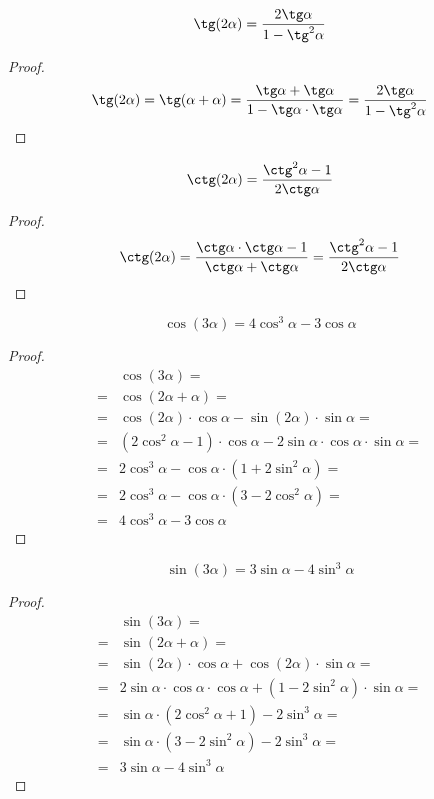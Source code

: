 \documentclass[12pt]{article}
\begin{document}
    \begin{statement}
        $$\tg(2\alpha)=\dfrac{2\tg\alpha}{1-\tg^2\alpha}$$
    \end{statement}
    \begin{proof}
        $$\tg(2\alpha)=\tg(\alpha+\alpha)=\dfrac{\tg\alpha+\tg\alpha}{1-\tg\alpha\cdot\tg\alpha}=\dfrac{2\tg\alpha}{1-\tg^2\alpha}$$
    \end{proof}
    \begin{statement}
        $$\ctg(2\alpha)=\dfrac{\ctg^2\alpha-1}{2\ctg\alpha}$$
    \end{statement}
    \begin{proof}
        $$\ctg(2\alpha)=\dfrac{\ctg\alpha\cdot\ctg\alpha-1}{\ctg\alpha+\ctg\alpha}=\dfrac{\ctg^2\alpha-1}{2\ctg\alpha}$$
    \end{proof}
    \begin{statement}
        $$\cos(3\alpha)=4\cos^3\alpha-3\cos\alpha$$
    \end{statement}
    \begin{proof}
        \begin{align*}
            &\cos(3\alpha)=\\
            =&\cos(2\alpha+\alpha)=\\
            =&\cos(2\alpha)\cdot\cos\alpha-\sin(2\alpha)\cdot\sin\alpha=\\
            =&(2\cos^2\alpha-1)\cdot\cos\alpha-2\sin\alpha\cdot\cos\alpha\cdot\sin\alpha=\\
            =&2\cos^3\alpha-\cos\alpha\cdot(1+2\sin^2\alpha)=\\
            =&2\cos^3\alpha-\cos\alpha\cdot(3-2\cos^2\alpha)=\\
            =&4\cos^3\alpha-3\cos\alpha
        \end{align*}
    \end{proof}
    \begin{statement}
        $$\sin(3\alpha)=3\sin\alpha-4\sin^3\alpha$$
    \end{statement}
    \begin{proof}
        \begin{align*}
            &\sin(3\alpha)=\\
            =&\sin(2\alpha+\alpha)=\\
            =&\sin(2\alpha)\cdot\cos\alpha+\cos(2\alpha)\cdot\sin\alpha=\\
            =&2\sin\alpha\cdot\cos\alpha\cdot\cos\alpha+(1-2\sin^2\alpha)\cdot\sin\alpha=\\
            =&\sin\alpha\cdot(2\cos^2\alpha+1)-2\sin^3\alpha=\\
            =&\sin\alpha\cdot(3-2\sin^2\alpha)-2\sin^3\alpha=\\
            =&3\sin\alpha-4\sin^3\alpha
        \end{align*}
    \end{proof}
\end{document}
